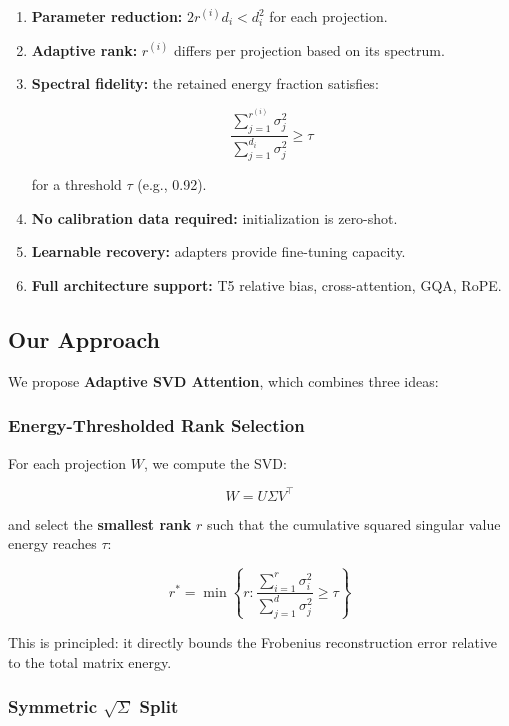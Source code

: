 \begin{enumerate}
\item \textbf{Parameter reduction:} $2 r^{(i)} d_i < d_i^2$ for each projection.
\item \textbf{Adaptive rank:} $r^{(i)}$ differs per projection based on its spectrum.
\item \textbf{Spectral fidelity:} the retained energy fraction satisfies:
  
  $$\frac{\sum_{j=1}^{r^{(i)}} \sigma_j^2}{\sum_{j=1}^{d_i} \sigma_j^2} \geq \tau$$
  
  for a threshold $\tau$ (e.g., 0.92).
\item \textbf{No calibration data required:} initialization is zero-shot.
\item \textbf{Learnable recovery:} adapters provide fine-tuning capacity.
\item \textbf{Full architecture support:} T5 relative bias, cross-attention, GQA, RoPE.

\end{enumerate}
\subsection{Our Approach}

We propose \textbf{Adaptive SVD Attention}, which combines three ideas:

\subsubsection{Energy-Thresholded Rank Selection}

For each projection $W$, we compute the SVD:

\begin{equation}
W = U \Sigma V^\top
\end{equation}

and select the \textbf{smallest rank} $r$ such that the cumulative squared 
singular value energy reaches $\tau$:

\begin{equation}
r^* = \min\left\{ r : \frac{\sum_{i=1}^{r} \sigma_i^2}{\sum_{j=1}^{d} \sigma_j^2} \geq \tau \right\}
\end{equation}

This is principled: it directly bounds the Frobenius reconstruction error 
relative to the total matrix energy.

\subsubsection{Symmetric $\sqrt{\Sigma}$ Split}

